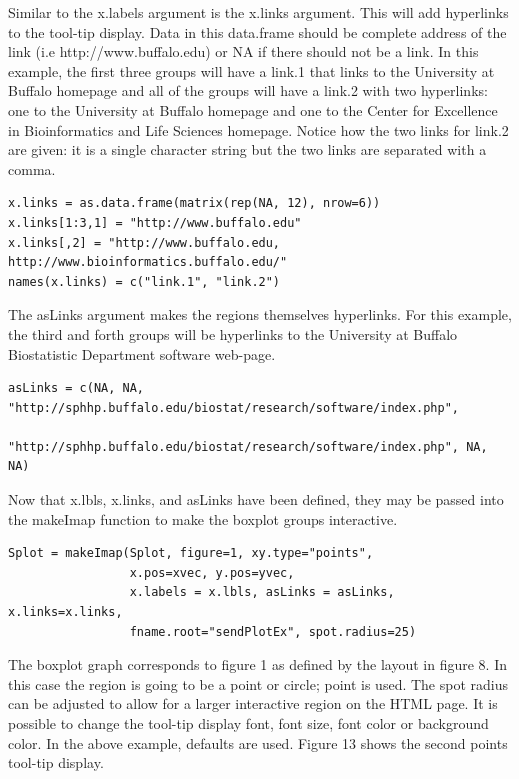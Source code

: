 \documentclass[]{article}
\begin{document}
Similar to the x.labels argument is the x.links argument. This will add hyperlinks to the tool-tip display. Data in this data.frame should be complete address of the link (i.e http://www.buffalo.edu) or NA if there should not be a link. In this example, the first three groups will have a link.1 that links to the University at Buffalo homepage and all of the groups will have a link.2 with two hyperlinks: one to the University at Buffalo homepage and one to the Center for Excellence in Bioinformatics and Life Sciences homepage. Notice how the two links for link.2 are given: it is a single character string but the two links are separated with a comma. 


\begin{verbatim}
x.links = as.data.frame(matrix(rep(NA, 12), nrow=6))
x.links[1:3,1] = "http://www.buffalo.edu"
x.links[,2] = "http://www.buffalo.edu, http://www.bioinformatics.buffalo.edu/"
names(x.links) = c("link.1", "link.2")
\end{verbatim}

The asLinks argument makes the regions themselves hyperlinks. For this example, the third and forth groups will be hyperlinks to the University at Buffalo Biostatistic Department software web-page. 


\begin{verbatim}
asLinks = c(NA, NA, "http://sphhp.buffalo.edu/biostat/research/software/index.php", 
           "http://sphhp.buffalo.edu/biostat/research/software/index.php", NA, NA)
\end{verbatim}

Now that x.lbls, x.links, and asLinks have been defined, they may be passed into the makeImap function to make the boxplot groups interactive. 



\begin{verbatim}
Splot = makeImap(Splot, figure=1, xy.type="points",
                 x.pos=xvec, y.pos=yvec,
                 x.labels = x.lbls, asLinks = asLinks, x.links=x.links, 
                 fname.root="sendPlotEx", spot.radius=25)
\end{verbatim}

The boxplot graph corresponds to figure 1 as defined by the layout in figure 8. In this case the region is going to be a point or circle; point is used. The spot radius can be adjusted to allow for a larger interactive region on the HTML page. It is possible to change the tool-tip display font, font size, font color or background color. In the above example, defaults are used. Figure 13 shows the second points tool-tip display.
\end{document}
